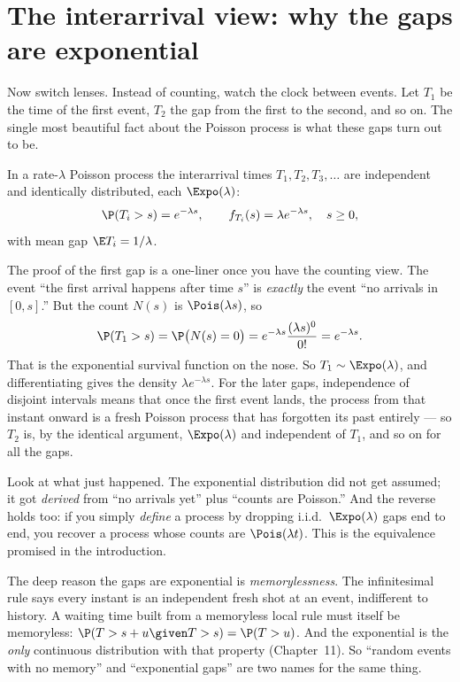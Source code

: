 \section{The interarrival view: why the gaps are exponential}
\label{ch25:interarrival}

Now switch lenses. Instead of counting, watch the clock between events. Let $T_1$
be the time of the first event, $T_2$ the gap from the first to the second, and
so on. The single most beautiful fact about the Poisson process is what these
gaps turn out to be.

\begin{theorem}
\label{ch25:thm-exponential}
In a rate-$\lambda$ Poisson process the interarrival times
$T_1, T_2, T_3, \dots$ are independent and identically distributed, each
$\Expo(\lambda)$:
\[
\P(T_i > s) = e^{-\lambda s}, \qquad f_{T_i}(s) = \lambda e^{-\lambda s},
\quad s \ge 0,
\]
with mean gap $\E T_i = 1/\lambda$.
\end{theorem}

\begin{whybox}
The proof of the first gap is a one-liner once you have the counting view. The
event ``the first arrival happens after time $s$'' is \emph{exactly} the event
``no arrivals in $[0,s]$.'' But the count $N(s)$ is $\Pois(\lambda s)$, so
\[
\P(T_1 > s) = \P\big(N(s) = 0\big) = e^{-\lambda s}\frac{(\lambda s)^0}{0!}
= e^{-\lambda s}.
\]
That is the exponential survival function on the nose. So $T_1 \sim
\Expo(\lambda)$, and differentiating gives the density $\lambda e^{-\lambda s}$.
For the later gaps, independence of disjoint intervals means that once the first
event lands, the process from that instant onward is a fresh Poisson process that
has forgotten its past entirely --- so $T_2$ is, by the identical argument,
$\Expo(\lambda)$ and independent of $T_1$, and so on for all the gaps.
\end{whybox}

Look at what just happened. The exponential distribution did not get assumed; it
got \emph{derived} from ``no arrivals yet'' plus ``counts are Poisson.'' And the
reverse holds too: if you simply \emph{define} a process by dropping i.i.d.\
$\Expo(\lambda)$ gaps end to end, you recover a process whose counts are
$\Pois(\lambda t)$. This is the equivalence promised in the introduction.

\begin{intuitionbox}
The deep reason the gaps are exponential is \emph{memorylessness}. The
infinitesimal rule says every instant is an independent fresh shot at an event,
indifferent to history. A waiting time built from a memoryless local rule must
itself be memoryless: $\P(T > s+u \given T > s) = \P(T > u)$. And the exponential
is the \emph{only} continuous distribution with that property (Chapter~11). So
``random events with no memory'' and ``exponential gaps'' are two names for the
same thing.
\end{intuitionbox}

